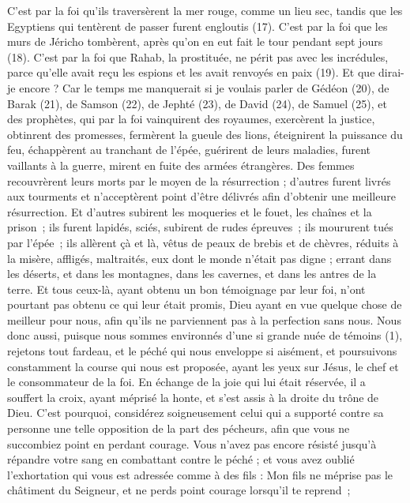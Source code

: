 \begin{multicols}{2}
C’est par la foi qu’ils traversèrent la mer rouge, comme un lieu sec, tandis que les Egyptiens qui tentèrent de passer furent engloutis (17).
C’est par la foi que les murs de Jéricho tombèrent, après qu'on en eut fait le tour pendant sept jours (18).
C’est par la foi que Rahab, la prostituée, ne périt pas avec les incrédules, parce qu’elle avait reçu les espions et les avait renvoyés en paix (19).
Et que dirai-je encore ? Car le temps me manquerait si je voulais parler de Gédéon (20), de Barak (21), de Samson (22), de Jephté (23), de David (24), de Samuel (25), et des prophètes,
qui par la foi vainquirent des royaumes, exercèrent la justice, obtinrent des promesses, fermèrent la gueule des lions,
éteignirent la puissance du feu, échappèrent au tranchant de l’épée, guérirent de leurs maladies, furent vaillants à la guerre, mirent en fuite des armées étrangères.
Des femmes recouvrèrent leurs morts par le moyen de la résurrection ; d'autres furent livrés aux tourments et n’acceptèrent point d'être délivrés afin d'obtenir une meilleure résurrection.
Et d'autres subirent les moqueries et le fouet, les chaînes et la prison ;
ils furent lapidés, sciés, subirent de rudes épreuves ; ils moururent tués par l'épée ; ils allèrent çà et là, vêtus de peaux de brebis et de chèvres, réduits à la misère, affligés, maltraités,
eux dont le monde n'était pas digne ; errant dans les déserts, et dans les montagnes, dans les cavernes, et dans les antres de la terre.
Et tous ceux-là, ayant obtenu un bon témoignage par leur foi, n'ont pourtant pas obtenu ce qui leur était promis,
Dieu ayant en vue quelque chose de meilleur pour nous, afin qu'ils ne parviennent pas à la perfection sans nous.
\VerseOne{}Nous donc aussi, puisque nous sommes environnés d'une si grande nuée de témoins (1), rejetons tout fardeau, et le péché qui nous enveloppe si aisément, et poursuivons constamment la course qui nous est proposée,
ayant les yeux sur Jésus, le chef et le consommateur de la foi. En échange de la joie qui lui était réservée, il a souffert la croix, ayant méprisé la honte, et s'est assis à la droite du trône de Dieu.
C'est pourquoi, considérez soigneusement celui qui a supporté contre sa personne une telle opposition de la part des pécheurs, afin que vous ne succombiez point en perdant courage.
Vous n'avez pas encore résisté jusqu'à répandre votre sang en combattant contre le péché ;
et vous avez oublié l'exhortation qui vous est adressée comme à des fils : Mon fils ne méprise pas le châtiment du Seigneur, et ne perds point courage lorsqu’il te reprend ;

\end{multicols}
